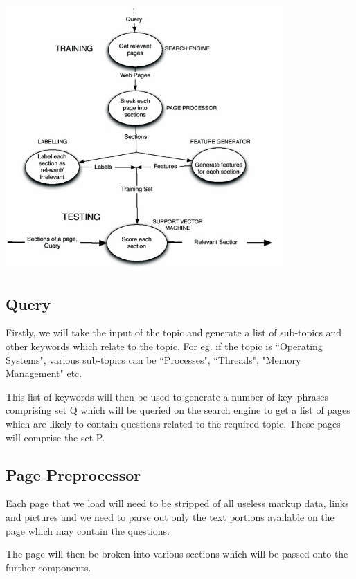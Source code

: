 \begin{center}
\includegraphics[width=0.80\textwidth]{./architecture}\\
\end{center}

\subsection{Query}

Firstly, we will take the input of the topic and generate a list of sub-topics and other keywords which relate to the topic. For eg. if the topic is ``Operating Systems", various sub-topics can be ``Processes", ``Threads", "Memory Management" etc.

This list of keywords will then be used to generate a number of key--phrases comprising set Q which will be queried on the search engine to get a list of pages which are likely to contain questions related to the required topic. These pages will comprise the set P.

\subsection{Page Preprocessor}

Each page that we load will need to be stripped of all useless markup data, links and pictures and we need to parse out only the text portions available on the page which may contain the questions. 

The page will then be broken into various sections which will be passed onto the further components.

